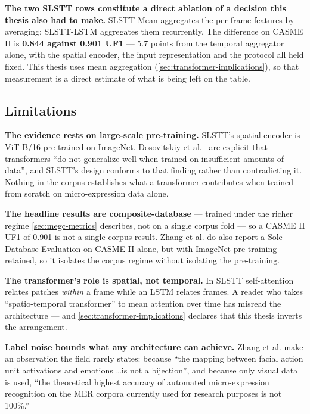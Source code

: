 \textbf{The two SLSTT rows constitute a direct ablation of a decision this thesis also had to make.} SLSTT-Mean aggregates the per-frame features by averaging; SLSTT-LSTM aggregates them recurrently. The difference on CASME II is \textbf{0.844 against 0.901 UF1} --- 5.7 points from the temporal aggregator alone, with the spatial encoder, the input representation and the protocol all held fixed. This thesis uses mean aggregation (\autoref{sec:transformer-implications}), so that measurement is a direct estimate of what is being left on the table.

\subsection{Limitations}
\label{sec:transformer-limitations}

\textbf{The evidence rests on large-scale pre-training.} SLSTT's spatial encoder is ViT-B/16 pre-trained on ImageNet. Dosovitskiy et al.~\cite{dosovitskiy2021} are explicit that transformers ``do not generalize well when trained on insufficient amounts of data'', and SLSTT's design conforms to that finding rather than contradicting it. Nothing in the corpus establishes what a transformer contributes when trained from scratch on micro-expression data alone.

\textbf{The headline results are composite-database} --- trained under the richer regime \autoref{sec:megc-metrics} describes, not on a single corpus fold --- so a CASME II UF1 of 0.901 is not a single-corpus result. Zhang et al. do also report a Sole Database Evaluation on CASME II alone, but with ImageNet pre-training retained, so it isolates the corpus regime without isolating the pre-training.

\textbf{The transformer's role is spatial, not temporal.} In SLSTT self-attention relates patches \textit{within} a frame while an LSTM relates frames. A reader who takes ``spatio-temporal transformer'' to mean attention over time has misread the architecture --- and \autoref{sec:transformer-implications} declares that this thesis inverts the arrangement.

\textbf{Label noise bounds what any architecture can achieve.} Zhang et al. make an observation the field rarely states: because ``the mapping between facial action unit activations and emotions \ldots is not a bijection'', and because only visual data is used, ``the theoretical highest accuracy of automated micro-expression recognition on the MER corpora currently used for research purposes is not 100\%.''

